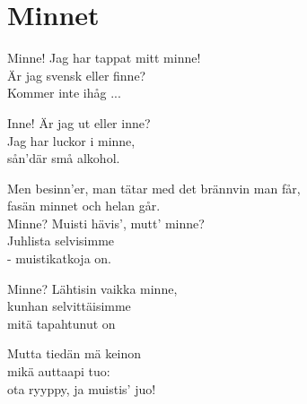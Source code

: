\section{Minnet}
Minne! Jag har tappat mitt minne!\\ 
Är jag svensk eller finne?\\
Kommer inte ihåg ...

Inne! Är jag ut eller inne? \\
Jag har luckor i minne, \\
sån’där små alkohol.

Men besinn’er, man tätar med det brännvin man får, \\
fasän minnet och helan går. \\

Minne? Muisti hävis’, mutt’ minne? \\
Juhlista selvisimme \\
- muistikatkoja on.

Minne? Lähtisin vaikka minne, \\
kunhan selvittäisimme \\
mitä tapahtunut on

Mutta tiedän mä keinon \\
mikä auttaapi tuo: \\
ota ryyppy, ja muistis’ juo!